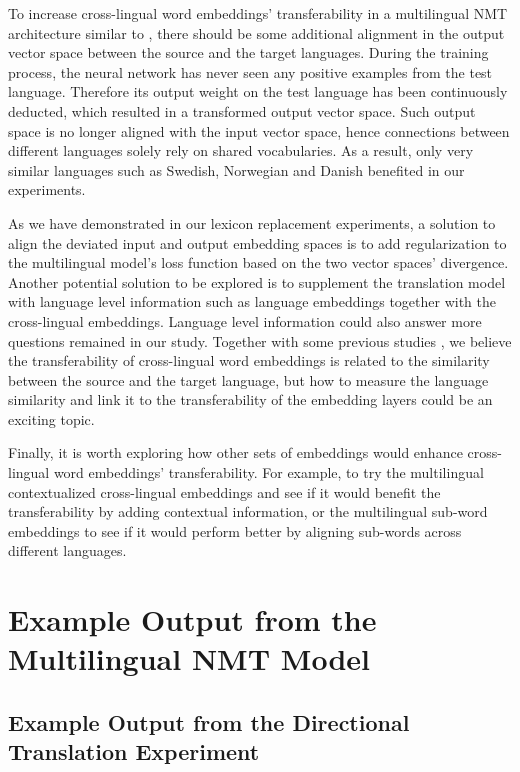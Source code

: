 \documentclass[thesis]{cluu}
\begin{document}
To increase cross-lingual word embeddings' transferability in a multilingual NMT architecture similar to \textcite{Johnson:2016aa}, there should be some additional alignment in the output vector space between the source and the target languages. During the training process, the neural network has never seen any positive examples from the test language. Therefore its output weight on the test language has been continuously deducted, which resulted in a transformed output vector space. Such output space is no longer aligned with the input vector space, hence connections between different languages solely rely on shared vocabularies. As a result, only very similar languages such as Swedish, Norwegian and Danish benefited in our experiments.

As we have demonstrated in our lexicon replacement experiments, a solution to align the deviated input and output embedding spaces is to add regularization to the multilingual model's loss function based on the two vector spaces' divergence. Another potential solution to be explored is to supplement the translation model with language level information such as language embeddings \parencite{littell-etal-2017-uriel,malaviya-etal-2017-learning} together with the cross-lingual embeddings. Language level information could also answer more questions remained in our study. Together with some previous studies \parencite{Qi:2018aa,aji-etal-2020-neural}, we believe the transferability of cross-lingual word embeddings is related to the similarity between the source and the target language, but how to measure the language similarity and link it to the transferability of the embedding layers could be an exciting topic.

Finally, it is worth exploring how other sets of embeddings would enhance cross-lingual word embeddings' transferability. For example, to try the multilingual contextualized cross-lingual embeddings \parencite{devlin-etal-2019-bert} and see if it would benefit the transferability by adding contextual information, or the multilingual sub-word embeddings \parencite{Heinzerling:2017aa} to see if it would perform better by aligning sub-words across different languages.

\appendix
\chapter{Example Output from the Multilingual NMT Model}
\label{chap:example_output}

\section{Example Output from the Directional Translation Experiment}
\label{sec:directional_output}
\end{document}
